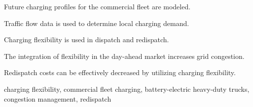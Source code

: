 \documentclass[final,10pt]{elsarticle}
\begin{document}
\begin{frontmatter}

\begin{abstract}

With the electrification of the transport sector, significant charging loads by the future commercial fleet are expected. The present work aims to give quantitative insight into how impactful the future charging loads of the battery-electric commercial fleet will be to the electricity system. We hereby focus on the day-ahead market and congestion management while applying the proposed modeling framework to the Austrian case with different shares of fleet electrification in 2040. The methodological framework encompasses the spatio-temporal modeling of charging loads as well as optimization models simulating the day-ahead market clearing and the implementation of redispatch measures. Results indicate increased costs for redispatch measures when the flexibility of the aggregated fleet is used in the cost-optimal dispatch. It is demonstrated that the flexibility of the charging processes can be effectively applied in congestion management and reduce redispatch costs by up to 35\%, while optimal charging profiles are observed to vary depending on their geographic allocation.
\end{abstract}



\begin{highlights}
\item Future charging profiles for the commercial fleet are modeled.
\item Traffic flow data is used to determine local charging demand.
\item Charging flexibility is used in dispatch and redispatch.
\item The integration of flexibility in the day-ahead market increases grid congestion.
\item Redispatch costs can be effectively decreased by utilizing charging flexibility.

\end{highlights}

\begin{keyword}
    charging flexibility, commercial fleet charging, battery-electric heavy-duty trucks, congestion management, redispatch 
\end{keyword}

\end{frontmatter}
\end{document}
